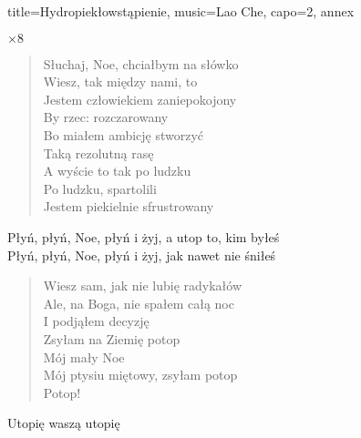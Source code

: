 \newpage
\begin{song}{title={Hydropiekłowstąpienie}, music={Lao Che}, capo=2, annex}
\small
\begin{multicols}{2}
    \begin{intro}
           
    \end{intro}
    \begin{riff}
            $\times 8$
    \end{riff}
    \begin{verse}
        Słuchaj, Noe, chciałbym na słówko \smallskip \\
        Wiesz, tak między nami, to \\
        Jestem człowiekiem zaniepokojony \\
        By rzec: rozczarowany \smallskip \\
        Bo miałem ambicję stworzyć \\
        Taką rezolutną rasę \smallskip \\
        A wyście to tak po ludzku \\
        Po ludzku, spartolili \smallskip \\
        Jestem piekielnie sfrustrowany
    \end{verse}
    \begin{interlude}
        Płyń, płyń, Noe, płyń i żyj, a utop to, kim byłeś \\
        Płyń, płyń, Noe, płyń i żyj, jak nawet nie śniłeś
    \end{interlude}
    \begin{verse}
        Wiesz sam, jak nie lubię radykałów \smallskip \\
        Ale, na Boga, nie spałem całą noc \\
        I podjąłem decyzję \smallskip \\
        Zsyłam na Ziemię potop \\
        Mój mały Noe \smallskip \\
        Mój ptysiu miętowy, zsyłam potop \\
        Potop!
    \end{verse}
    \begin{riff}
           
    \end{riff}
    \begin{chorus}
        Utopię waszą utopię \\

\end{chorus}
\end{multicols}
\end{song}
